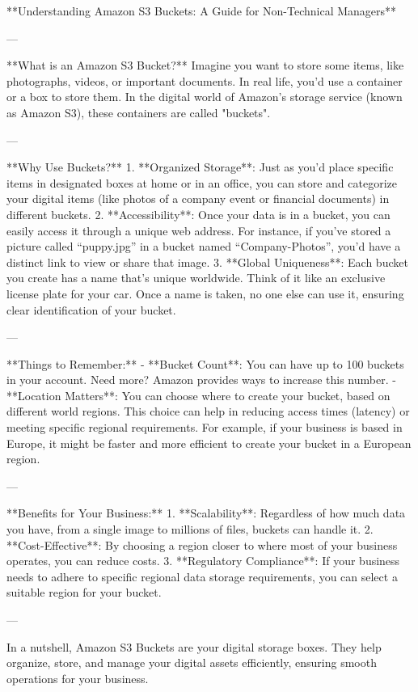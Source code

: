 **Understanding Amazon S3 Buckets: A Guide for Non-Technical Managers**

---

**What is an Amazon S3 Bucket?**
Imagine you want to store some items, like photographs, videos, or important documents. In real life, you'd use a container or a box to store them. In the digital world of Amazon's storage service (known as Amazon S3), these containers are called "buckets". 

---

**Why Use Buckets?**
1. **Organized Storage**: Just as you'd place specific items in designated boxes at home or in an office, you can store and categorize your digital items (like photos of a company event or financial documents) in different buckets.
2. **Accessibility**: Once your data is in a bucket, you can easily access it through a unique web address. For instance, if you've stored a picture called “puppy.jpg” in a bucket named “Company-Photos”, you'd have a distinct link to view or share that image.
3. **Global Uniqueness**: Each bucket you create has a name that's unique worldwide. Think of it like an exclusive license plate for your car. Once a name is taken, no one else can use it, ensuring clear identification of your bucket.

---

**Things to Remember:**
- **Bucket Count**: You can have up to 100 buckets in your account. Need more? Amazon provides ways to increase this number.
- **Location Matters**: You can choose where to create your bucket, based on different world regions. This choice can help in reducing access times (latency) or meeting specific regional requirements. For example, if your business is based in Europe, it might be faster and more efficient to create your bucket in a European region.

---

**Benefits for Your Business:**
1. **Scalability**: Regardless of how much data you have, from a single image to millions of files, buckets can handle it.
2. **Cost-Effective**: By choosing a region closer to where most of your business operates, you can reduce costs.
3. **Regulatory Compliance**: If your business needs to adhere to specific regional data storage requirements, you can select a suitable region for your bucket.

---

In a nutshell, Amazon S3 Buckets are your digital storage boxes. They help organize, store, and manage your digital assets efficiently, ensuring smooth operations for your business.